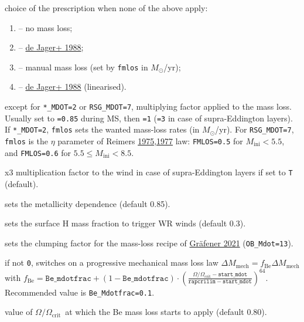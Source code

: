 \documentclass[11pt]{article}
\def\msol{\ensuremath{M_\odot}}
\def\om{\ensuremath{\Omega}}
\def\omcrit{\ensuremath{\om_\text{crit}}}
\def\omcrit{\ensuremath{\om_\text{crit}}}
\def\rapom{\ensuremath{\om/\omcrit}}
\begin{document}
\begin{description}
\begin{description}
\begin{enumerate}[labelindent=.5cm,font=\ttfamily \bfseries,label=\arabic*]
          \end{enumerate}
      \item[FALLBACK\_MDOT:] choice of the prescription when none of the above apply:
          \begin{enumerate}[labelindent=.5cm,font=\ttfamily \bfseries,label=\arabic*]
            \item[0] -- no mass loss;
            \item[1] -- \href{https://ui.adsabs.harvard.edu/abs/1988A&AS...72..259D}{de Jager+ 1988};
            \item[2] -- manual mass loss (set by \texttt{fmlos} in \msol/yr);
            \item[3] -- \href{https://ui.adsabs.harvard.edu/abs/1988A&AS...72..259D}{de Jager+ 1988} (linearised).
          \end{enumerate}
        \item[FMLOS:] except for \texttt{*\_MDOT=2} or \texttt{RSG\_MDOT=7}, multiplying factor applied to the mass loss. Usually set to \texttt{=0.85} during MS, then \texttt{=1} (\texttt{=3} in case of supra-Eddington layers). If \texttt{*\_MDOT=2}, \texttt{fmlos} sets the wanted mass-loss rates (in \msol/yr). For \texttt{RSG\_MDOT=7}, \texttt{fmlos} is the $\eta$ parameter of Reimers \href{https://ui.adsabs.harvard.edu/abs/1975MSRSL...8..369R}{1975},\href{https://ui.adsabs.harvard.edu/abs/1977A&A....57..395R}{1977} law: \texttt{FMLOS=0.5} for $M_\text{ini}<5.5$, and \texttt{FMLOS=0.6} for $5.5\leq M_\text{ini} < 8.5$.
        \item[SUPRAEDDMDOT:] x3 multiplication factor to the wind in case of supra-Eddington layers if set to \texttt{T} (default).
        \item[Z\_DEP:] sets the metallicity dependence (default 0.85).
        \item[Xs\_WR:] sets the surface H mass fraction to trigger WR winds (default 0.3).
        \item[D\_clump:] sets the clumping factor for the mass-loss recipe of \href{https://ui.adsabs.harvard.edu/abs/2021A&A...647A..13G}{Gr\"afener 2021} (\texttt{OB\_Mdot=13}).
        \item[BE\_MDOTFRAC:] if not \texttt{0}, switches on a progressive mechanical mass loss law $\Delta M_\text{mech}=f_\text{Be}\Delta M_\text{mech}$ with $f_\text{Be}=\mathtt{Be\_mdotfrac} + (1 - \mathtt{Be\_mdotfrac})\cdot\left(\frac{\rapom - \mathtt{start\_mdot}}{\mathtt{rapcrilim} - \mathtt{start\_mdot}}\right)^{64}$. Recommended value is \texttt{Be\_Mdotfrac=0.1}.
      \item[START\_MDOT:] value of \rapom\ at which the Be mass loss starts to apply (default 0.80).

\end{description}
\end{description}
\end{document}
